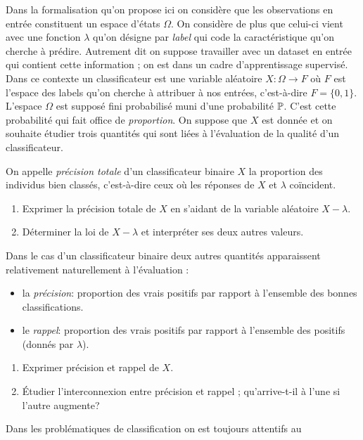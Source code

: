 \documentclass[11pt, a4paper]{article}
\begin{document}
Dans la formalisation qu'on propose ici on considère que les
observations en entrée constituent un espace d'états $\Omega$. On
considère de plus que celui-ci vient avec une fonction $\lambda$ qu'on
désigne par \textit{label} qui code la caractéristique qu'on cherche à
prédire. Autrement dit on suppose travailler avec un dataset en entrée
qui contient cette information ; on est dans un cadre d'apprentissage
supervisé. Dans ce contexte un classificateur est une variable
aléatoire $X : \Omega \to F$ où $F$ est l'espace des labels qu'on
cherche à attribuer à nos entrées, c'est-à-dire $F = \{0, 1\}
$. L'espace $\Omega$ est supposé fini probabilisé muni d'une
probabilité $\operatorname{\mathbb{P}}$. C'est cette probabilité qui fait office de
\textit{proportion}. On suppose que $X$ est donnée et on souhaite
étudier trois quantités qui sont liées à l'évaluation de la qualité
d'un classificateur.
\begin{question}
  On appelle \emph{précision totale} d'un classificateur binaire $X$
  la proportion des individus bien classés, c'est-à-dire ceux où les
  réponses de $X$ et $\lambda$ coïncident.
  \begin{enumerate}
  \item Exprimer la précision totale de $X$ en s'aidant de la variable
    aléatoire $X - \lambda$.
  \item Déterminer la loi de $X - \lambda$ et interpréter ses deux
    autres valeurs.
  \end{enumerate}
\end{question}
Dans le cas d'un classificateur binaire deux autres quantités
apparaissent relativement naturellement à l'évaluation :
\begin{itemize}
\item la \emph{précision}: proportion des vrais positifs par
  rapport à l'ensemble des bonnes classifications.
\item le \emph{rappel}: proportion des vrais positifs par rapport
  à l'ensemble des positifs (donnés par $\lambda$).
\end{itemize}
\begin{question}
  \begin{enumerate}
  \item Exprimer précision et rappel de $X$.
  \item Étudier l'interconnexion entre précision et rappel ;
    qu'arrive-t-il à l'une si l'autre augmente?
  \end{enumerate}
\end{question}
Dans les problématiques de classification on est toujours attentifs au
\end{document}
